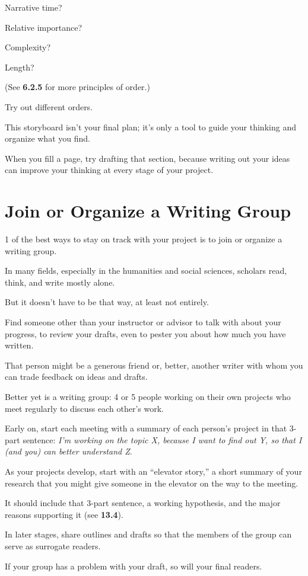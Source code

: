\documentclass[oneside]{book}
\numberwithin{equation}{section}
\begin{document}
Narrative time?

Relative importance?

Complexity?

Length?

(See \textbf{6.2.5} for more principles of order.)

Try out different orders.

This storyboard isn't your final plan; it's only a tool to guide your thinking and organize what you find.

When you fill a page, try drafting that section, because writing out your ideas can improve your thinking at every stage of your project.

\section{Join or Organize a Writing Group}
1 of the best ways to stay on track with your project is to join or organize a writing group.

In many fields, especially in the humanities and social sciences, scholars read, think, and write mostly alone.

But it doesn't have to be that way, at least not entirely.

Find someone other than your instructor or advisor to talk with about your progress, to review your drafts, even to pester you about how much you have written.

That person might be a generous friend or, better, another writer with whom you can trade feedback on ideas and drafts.

%
Better yet is a writing group: 4 or 5 people working on their own projects who meet regularly to discuss each other's work.

Early on, start each meeting with a summary of each person's project in that 3-part sentence: \textit{I'm working on the topic X, because I want to find out Y, so that I (and you) can better understand Z}.

As your projects develop, start with an ``elevator story,'' a short summary of your research that you might give someone in the elevator on the way to the meeting.

It should include that 3-part sentence, a working hypothesis, and the major reasons supporting it (see \textbf{13.4}).

In later stages, share outlines and drafts so that the members of the group can serve as surrogate readers.

If your group has a problem with your draft, so will your final readers.
\end{document}
